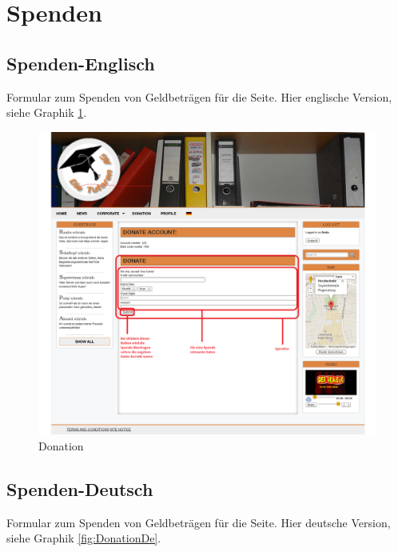 
\section{Spenden}

\subsection{Spenden-Englisch}
Formular zum Spenden von Geldbeträgen für die Seite. 
Hier englische Version, siehe Graphik \ref{fig:DonationEn}.


\begin{figure}[!htbp]
 \centering
 \includegraphics[width=1\textwidth]{../Screenshots/en/Donate_logged_in}
 \caption{Donation}
 \label{fig:DonationEn}
\end{figure}

\newpage

\subsection{Spenden-Deutsch}

Formular zum Spenden von Geldbeträgen für die Seite. 
Hier deutsche Version, siehe Graphik \ref{fig:DonationDe}.


